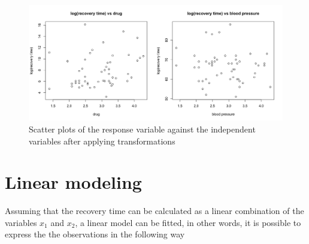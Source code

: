 \documentclass{article}
\begin{document}
\begin{figure}[H]
\centering
\includegraphics[width=1\textwidth]{tvs.png}
\caption{\label{fig:frog} Scatter plots of the response variable against the independent variables after applying transformations}
\end{figure}



\section{Linear modeling}

Assuming that the recovery time can be calculated as a linear combination of the variables $x_1$ and $x_2$, a linear model can be fitted, in other words, it is possible to express the the observations in the following way
\end{document}
